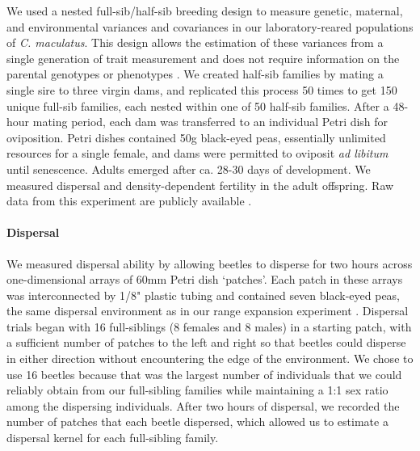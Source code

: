 \documentclass[11pt]{article}
\begin{document}
We used a nested full-sib/half-sib breeding design to measure genetic, maternal, and environmental variances and covariances in our laboratory-reared populations of \textit{C. maculatus}.
This design allows the estimation of these variances from a single generation of trait measurement and does not require information on the parental genotypes or phenotypes \citep{falconer_introduction_1996,conner_primer_2004,wilson_ecologists_2010}.
We created half-sib families by mating a single sire to three virgin dams, and replicated this process 50 times to get 150 unique full-sib families, each nested within one of 50 half-sib families.
After a 48-hour mating period, each dam was transferred to an individual Petri dish for oviposition.
Petri dishes contained 50g black-eyed peas, essentially unlimited resources for a single female, and dams were permitted to oviposit \textit{ad libitum} until senescence.
Adults emerged after ca. 28-30 days of development.
We measured dispersal and density-dependent fertility in the adult offspring.
Raw data from this experiment are publicly available \citep{ochocki_data}. 

\paragraph{Dispersal}
We measured dispersal ability by allowing beetles to disperse for two hours across one-dimensional arrays of 60mm Petri dish `patches'.
Each patch in these arrays was interconnected by 1/8" plastic tubing and contained seven black-eyed peas, the same dispersal environment as in our range expansion experiment \citep{ochocki_rapid_2017}.
Dispersal trials began with 16 full-siblings (8 females and 8 males) in a starting patch, with a sufficient number of patches to the left and right so that beetles could disperse in either direction without encountering the edge of the environment.
We chose to use 16 beetles because that was the largest number of individuals that we could reliably obtain from our full-sibling families while maintaining a 1:1 sex ratio among the dispersing individuals.
After two hours of dispersal, we recorded the number of patches that each beetle dispersed, which allowed us to estimate a dispersal kernel for each full-sibling family.
\end{document}
